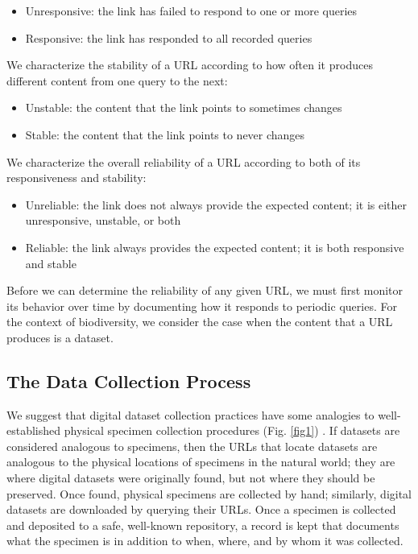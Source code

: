 \begin{itemize}
    \item Unresponsive: the link has failed to respond to one or more queries
    \item Responsive: the link has responded to all recorded queries
\end{itemize}

We characterize the stability of a URL according to how often it produces different content from one query to the next:

\begin{itemize}
    \item Unstable: the content that the link points to sometimes changes
    \item Stable: the content that the link points to never changes
\end{itemize}

We characterize the overall reliability of a URL according to both of its responsiveness and stability:

\begin{itemize}
    \item Unreliable: the link does not always provide the expected content; it is either unresponsive, unstable, or both 
    \item Reliable: the link always provides the expected content; it is both responsive and stable
\end{itemize}

Before we can determine the reliability of any given URL, we must first monitor its behavior over time by documenting how it responds to periodic queries. For the context of biodiversity, we consider the case when the content that a URL produces is a dataset.

\subsection*{The Data Collection Process}

We suggest that digital dataset collection practices have some analogies to well-established physical specimen collection procedures (Fig. \ref{fig1}) \citep{Poelen_2019}. If datasets are considered analogous to specimens, then the URLs that locate datasets are analogous to the physical locations of specimens in the natural world; they are where digital datasets were originally found, but not where they should be preserved. Once found, physical specimens are collected by hand; similarly, digital datasets are downloaded by querying their URLs. Once a specimen is collected and deposited to a safe, well-known repository, a record is kept that documents what the specimen is in addition to when, where, and by whom it was collected. 

